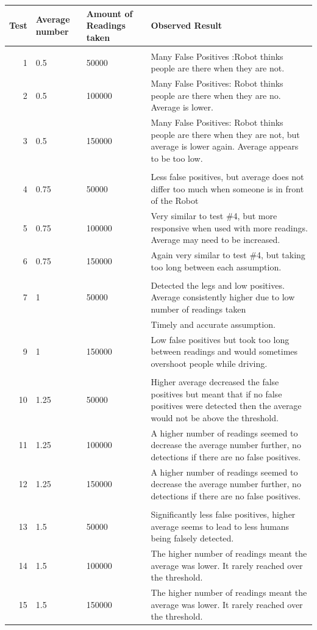\documentclass{article}
\newcommand{\bftab}{\fontseries{b}\selectfont}
\begin{document}
	\begin{supertabular}{r | p{2cm} | p{2.5cm} | p{8cm} }
	Test & Average number & Amount of Readings taken & Observed Result \\
	\hline
	  &  &  \\[2ex]
	1 & 0.5 & 50000 & Many False Positives :Robot thinks people are there when they are not. \\[1ex]
	2 & 0.5 & 100000 & Many False Positives: Robot thinks people are there when they are no. Average is lower. \\ [1ex]
3 & 0.5 & 150000 & Many False Positives: Robot thinks people are there when they are not, but average is lower again. Average appears to be too low. \\ [0ex]

	  &  &  \\[2ex]
4 & 0.75 & 50000 & Less false positives, but average does not differ too much when someone is in front of the Robot \\[1ex] 
5 & 0.75 & 100000 & Very similar to test \#4, but more responsive when used with more readings. Average may need to be increased. \\ [0ex]
6 & 0.75 & 150000 & Again very similar to test \#4, but taking too long between each assumption. \\ [1ex]

	  &  &  \\[2ex]
7 & 1 & 50000 & Detected the legs and low positives. Average consistently higher due to low number of readings taken \\ [1ex]
\bftab 8 & \bftab 1 & \bftab 100000 & \bftab Timely and  accurate assumption. \\ [2ex]
9 & 1 & 150000 & Low false positives but took too long between readings and would sometimes overshoot people while driving. \\ [1ex]

	  &  &  \\[2ex]
10 & 1.25 & 50000 & Higher average decreased the false positives but meant that if no false positives were detected then the average would not be above the threshold. \\ [0ex]
11 & 1.25 & 100000 & A higher number of readings seemed to decrease the average number further, no detections if there are no false positives. \\ [0ex]
12 & 1.25 & 150000 & A higher number of readings seemed to decrease the average number further, no detections if there are no false positives.  \\[0ex] 

	  &  &  \\[2ex]
13 & 1.5 & 50000 & Significantly less false positives, higher average seems to lead to less humans being falsely detected. \\ [1ex]
14 & 1.5 & 100000 & The higher number of readings meant the average was lower. It rarely reached over the threshold. \\ [1ex]
15 & 1.5 & 150000 & The higher number of readings meant the average was lower. It rarely reached over the threshold. \\[1ex]
	
	\end{supertabular}
\end{document}
